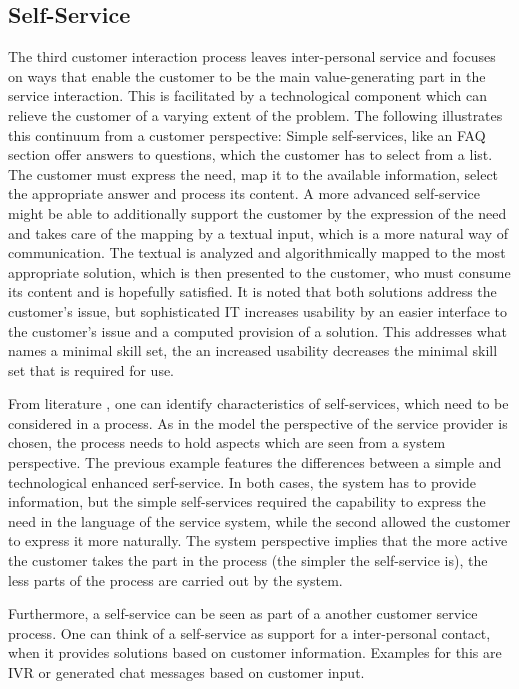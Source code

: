 	
	 
	\subsection{Self-Service}
	
	The third customer interaction process leaves inter-personal service \citep{Thomas2008self} and focuses on ways that enable the customer to be the main value-generating part in the service interaction. This is facilitated by a technological component which can relieve the customer of a varying extent of the problem. The following illustrates this continuum from a customer perspective: Simple self-services, like an \acrshort{FAQ} section offer answers to questions, which the customer has to select from a list. The customer must express the need, map it to the available information, select the appropriate answer and process its content. A more advanced self-service might be able to additionally support the customer by the expression of the need and takes care of the mapping by a textual input, which is a more natural way of communication. The textual is analyzed and algorithmically mapped to the most appropriate solution, which is then presented to the customer, who must consume its content and is hopefully satisfied. It is noted that both solutions address the customer's issue, but sophisticated \acrshort{IT} increases usability by an easier interface to the customer's issue and a computed provision of a solution. This addresses what \citep{Thomas2008self} names a minimal skill set, \viz the an increased usability decreases the minimal skill set that is required for use. 
	
	From literature \citep{meuter2000self, Thomas2008self, Thomas:2009}, one can identify characteristics of self-services, which need to be considered in a process. As in the model the perspective of the service provider is chosen, the process needs to hold aspects which are seen from a system perspective. The previous example features the differences between a simple and technological enhanced serf-service. In both cases, the system has to provide information, but the simple self-services required the capability to express the need in the language of the service system, while the second allowed the customer to express it more naturally. The system perspective implies that the more active the customer takes the part in the process (\ie the simpler the self-service is), the less parts of the process are carried out by the system. 
	
	Furthermore, a self-service can be seen as part of a another customer service process. One can think of a self-service as support for a inter-personal contact, when it provides solutions based on customer information. Examples for this are \acrshort{IVR} or generated chat messages based on customer input.
	
